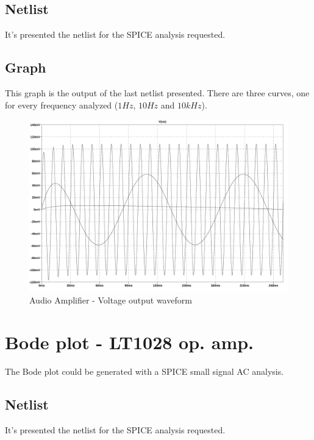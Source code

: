 \documentclass[10pt,a4paper]{book}
\begin{document}
\subsection{Netlist}
It's presented the netlist for the SPICE analysis requested.\\


\subsection{Graph}
This graph is the output of the last netlist presented. There are three curves, one for every frequency analyzed ($1Hz$, $10Hz$ and $10kHz$).\\

\begin{figure}[H]
  \centering
  \includegraphics[width=14cm]{graph/1d2.jpg}
  \caption{Audio Amplifier - Voltage output waveform}
  \label{1d2graph}
\end{figure}

\section{Bode plot - LT1028 op. amp.}
The Bode plot could be generated with a SPICE small signal AC analysis.\par

\subsection{Netlist}
It's presented the netlist for the SPICE analysis requested.\\


\end{document}

